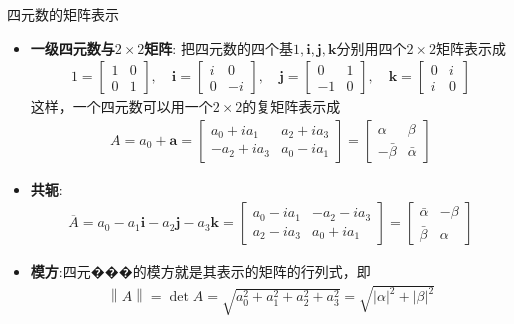 \documentclass[UTF8,AutoFakeBold,AutoFakeSlant]{beamer}
\begin{document}
\begin{frame}{四元数的矩阵表示}
    \begin{itemize}
        \scriptsize
        \item \textbf{一级四元数与$2\times 2$矩阵}: 把四元数的四个基$1,\mathbf{i},\mathbf{j},\mathbf{k}$分别用四个$2\times 2$矩阵表示成
              \begin{align*}
                  1=\begin{bmatrix} 1 & 0\\ 0 & 1\end{bmatrix}, \quad\mathbf{i}=\begin{bmatrix} i & 0\\ 0 & -i\end{bmatrix},\quad\mathbf{j}=\begin{bmatrix} 0 & 1\\ -1 & 0\end{bmatrix},\quad\mathbf{k}=\begin{bmatrix} 0 & i\\ i & 0\end{bmatrix}
              \end{align*}
              这样，一个四元数可以用一个$2\times 2$的复矩阵表示成
              \begin{align*}
                  A=a_0+\mathbf{a}=\begin{bmatrix} a_0+ia_1 & a_2+ia_3\\ -a_2+ia_3 & a_0-ia_1\end{bmatrix}=\begin{bmatrix} \alpha & \beta\\ -\bar{\beta} & \bar{\alpha}\end{bmatrix}
              \end{align*}
        \item \textbf{共轭}:
              \begin{align*}
                  \overline{A}=a_0-a_1\mathbf{i}-a_2\mathbf{j}-a_3\mathbf{k}=\begin{bmatrix} a_0-ia_1 & -a_2-ia_3\\ a_2-ia_3 & a_0+ia_1\end{bmatrix}=\begin{bmatrix} \bar{\alpha} & -\beta\\ \bar{\beta} & \alpha\end{bmatrix}
              \end{align*}
        \item \textbf{模方}:四元���的模方就是其表示的矩阵的行列式，即
              \begin{align*}
                  \left\|A\right\|=\det A=\sqrt{a_0^2+a_1^2+a_2^2+a_3^2}=\sqrt{\left|\alpha\right|^2+\left|\beta\right|^2}
              \end{align*}

    \end{itemize}
\end{frame}
\end{document}
